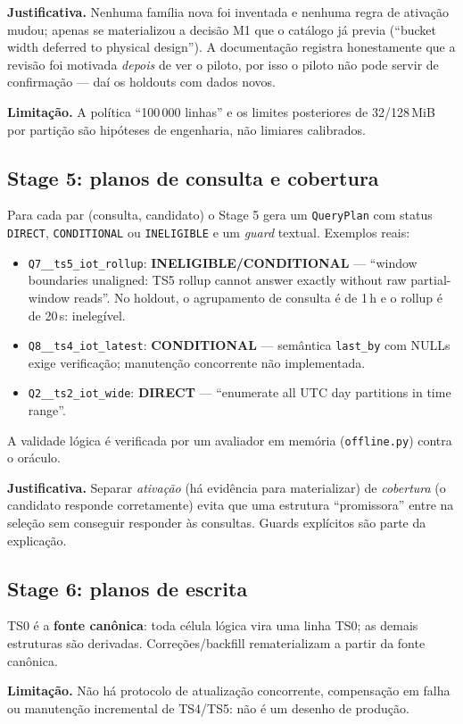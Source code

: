 \documentclass[11pt,a4paper]{article}
\newcommand{\caixa}[2][boxbg]{\par\smallskip\noindent\colorbox{#1}{\parbox{\dimexpr\linewidth-2\fboxsep}{#2}}\par\smallskip}
\newcommand{\just}[1]{\caixa{\textbf{Justificativa.} #1}}
\newcommand{\limit}[1]{\caixa[warnbg]{\textbf{Limitação.} #1}}
\begin{document}
\just{Nenhuma família nova foi inventada e nenhuma regra de ativação mudou; apenas se materializou a decisão M1 que o catálogo já previa (``bucket width deferred to physical design''). A documentação registra honestamente que a revisão foi motivada \emph{depois} de ver o piloto, por isso o piloto não pode servir de confirmação --- daí os holdouts com dados novos.}
\limit{A política ``100\,000 linhas'' e os limites posteriores de 32/128\,MiB por partição são hipóteses de engenharia, não limiares calibrados.}

\subsection{Stage 5: planos de consulta e cobertura}
Para cada par (consulta, candidato) o Stage 5 gera um \texttt{QueryPlan} com status \texttt{DIRECT}, \texttt{CONDITIONAL} ou \texttt{INELIGIBLE} e um \emph{guard} textual. Exemplos reais:
\begin{itemize}
\item \texttt{Q7\_\_ts5\_iot\_rollup}: \textbf{INELIGIBLE/CONDITIONAL} --- ``window boundaries unaligned: TS5 rollup cannot answer exactly without raw partial-window reads''. No holdout, o agrupamento de consulta é de 1\,h e o rollup é de 20\,s: inelegível.
\item \texttt{Q8\_\_ts4\_iot\_latest}: \textbf{CONDITIONAL} --- semântica \texttt{last\_by} com NULLs exige verificação; manutenção concorrente não implementada.
\item \texttt{Q2\_\_ts2\_iot\_wide}: \textbf{DIRECT} --- ``enumerate all UTC day partitions in time range''.
\end{itemize}
A validade lógica é verificada por um avaliador em memória (\texttt{offline.py}) contra o oráculo.

\just{Separar \emph{ativação} (há evidência para materializar) de \emph{cobertura} (o candidato responde corretamente) evita que uma estrutura ``promissora'' entre na seleção sem conseguir responder às consultas. Guards explícitos são parte da explicação.}

\subsection{Stage 6: planos de escrita}
TS0 é a \textbf{fonte canônica}: toda célula lógica vira uma linha TS0; as demais estruturas são derivadas. Correções/backfill rematerializam a partir da fonte canônica.
\limit{Não há protocolo de atualização concorrente, compensação em falha ou manutenção incremental de TS4/TS5: não é um desenho de produção.}
\end{document}
